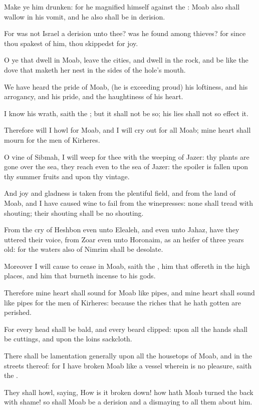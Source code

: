 \verse Make ye him drunken: for he magnified himself against the \LORD: Moab also shall wallow in his vomit, and he also shall be in derision.

\verse For was not Israel a derision unto thee? was he found among thieves?  for since thou spakest of him, thou skippedst for joy.

\verse O ye that dwell in Moab, leave the cities, and dwell in the rock, and be like the dove that maketh her nest in the sides of the hole's mouth.

\verse We have heard the pride of Moab, (he is exceeding proud) his loftiness, and his arrogancy, and his pride, and the haughtiness of his heart.

\verse I know his wrath, saith the \LORD; but it shall not be so; his lies shall not so effect it.

\verse Therefore will I howl for Moab, and I will cry out for all Moab; mine heart shall mourn for the men of Kirheres.

\verse O vine of Sibmah, I will weep for thee with the weeping of Jazer: thy plants are gone over the sea, they reach even to the sea of Jazer: the spoiler is fallen upon thy summer fruits and upon thy vintage.

\verse And joy and gladness is taken from the plentiful field, and from the land of Moab, and I have caused wine to fail from the winepresses: none shall tread with shouting; their shouting shall be no shouting.

\verse From the cry of Heshbon even unto Elealeh, and even unto Jahaz, have they uttered their voice, from Zoar even unto Horonaim, as an heifer of three years old: for the waters also of Nimrim shall be desolate.

\verse Moreover I will cause to cease in Moab, saith the \LORD, him that offereth in the high places, and him that burneth incense to his gods.

\verse Therefore mine heart shall sound for Moab like pipes, and mine heart shall sound like pipes for the men of Kirheres: because the riches that he hath gotten are perished.

\verse For every head shall be bald, and every beard clipped: upon all the hands shall be cuttings, and upon the loins sackcloth.

\verse There shall be lamentation generally upon all the housetops of Moab, and in the streets thereof: for I have broken Moab like a vessel wherein is no pleasure, saith the \LORD.

\verse They shall howl, saying, How is it broken down! how hath Moab turned the back with shame! so shall Moab be a derision and a dismaying to all them about him.


